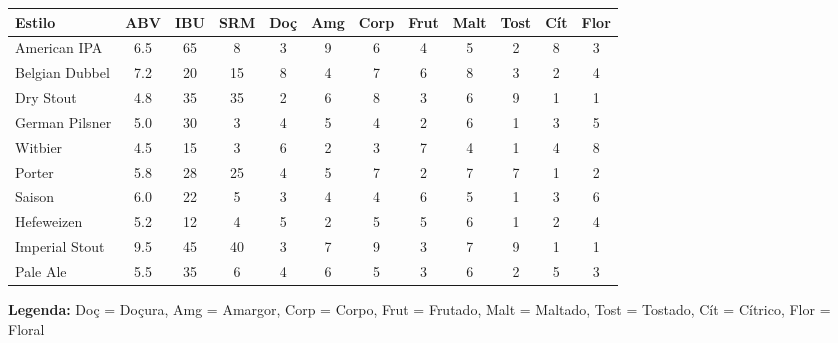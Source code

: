 \documentclass[12pt,a4paper]{article}
\begin{document}
\begin{table}[H]
\centering
\scriptsize
\begin{tabular}{|l|c|c|c|c|c|c|c|c|c|c|c|}
\hline
\textbf{Estilo} & \textbf{ABV} & \textbf{IBU} & \textbf{SRM} & \textbf{Doç} & \textbf{Amg} & \textbf{Corp} & \textbf{Frut} & \textbf{Malt} & \textbf{Tost} & \textbf{Cít} & \textbf{Flor} \\
\hline
American IPA & 6.5 & 65 & 8 & 3 & 9 & 6 & 4 & 5 & 2 & 8 & 3 \\
Belgian Dubbel & 7.2 & 20 & 15 & 8 & 4 & 7 & 6 & 8 & 3 & 2 & 4 \\
Dry Stout & 4.8 & 35 & 35 & 2 & 6 & 8 & 3 & 6 & 9 & 1 & 1 \\
German Pilsner & 5.0 & 30 & 3 & 4 & 5 & 4 & 2 & 6 & 1 & 3 & 5 \\
Witbier & 4.5 & 15 & 3 & 6 & 2 & 3 & 7 & 4 & 1 & 4 & 8 \\
Porter & 5.8 & 28 & 25 & 4 & 5 & 7 & 2 & 7 & 7 & 1 & 2 \\
Saison & 6.0 & 22 & 5 & 3 & 4 & 4 & 6 & 5 & 1 & 3 & 6 \\
Hefeweizen & 5.2 & 12 & 4 & 5 & 2 & 5 & 5 & 6 & 1 & 2 & 4 \\
Imperial Stout & 9.5 & 45 & 40 & 3 & 7 & 9 & 3 & 7 & 9 & 1 & 1 \\
Pale Ale & 5.5 & 35 & 6 & 4 & 6 & 5 & 3 & 6 & 2 & 5 & 3 \\
\hline
\end{tabular}
\end{table}

\textbf{Legenda:} Doç = Doçura, Amg = Amargor, Corp = Corpo, Frut = Frutado, Malt = Maltado, Tost = Tostado, Cít = Cítrico, Flor = Floral
\end{document}
